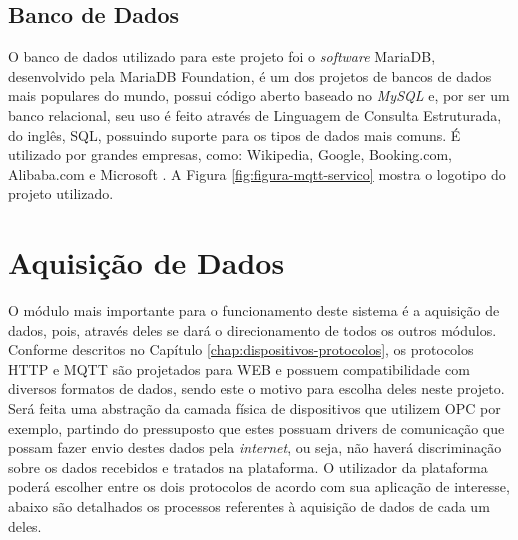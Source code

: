         \subsection{Banco de Dados}
        \label{sec:banco-dados}
        O banco de dados utilizado para este projeto foi o \textit{software} MariaDB, desenvolvido pela MariaDB Foundation, é um dos projetos de bancos de dados mais populares do mundo, possui código aberto baseado no \textit{MySQL} e, por ser um banco relacional, seu uso é feito através de Linguagem de Consulta Estruturada, do inglês, \gls{SQL}, possuindo suporte para os tipos de dados mais comuns. É utilizado por grandes empresas, como: Wikipedia, Google, Booking.com, Alibaba.com e Microsoft \cite{MariaDB}. A Figura \ref{fig:figura-mqtt-servico} mostra o logotipo do projeto utilizado.
        
        \begin{figure}[!h]
    	\end{figure}
    	
\section{Aquisição de Dados}
\label{sec:aquisicao-dados}
O módulo mais importante para o funcionamento deste sistema é a aquisição de dados, pois, através deles se dará o direcionamento de todos os outros módulos. Conforme descritos no Capítulo \ref{chap:dispositivos-protocolos}, os protocolos \gls{HTTP} e \gls{MQTT} são  projetados para \gls{WEB} e possuem compatibilidade com diversos formatos de dados, sendo este o motivo para escolha deles neste projeto. Será feita uma abstração da camada física de dispositivos que utilizem \gls{OPC} por exemplo, partindo do pressuposto que estes possuam drivers de comunicação que possam fazer envio destes dados pela \textit{internet}, ou seja, não haverá discriminação sobre os dados recebidos e tratados na plataforma. O utilizador da plataforma poderá escolher entre os dois protocolos de acordo com sua aplicação de interesse, abaixo são detalhados os processos referentes à aquisição de dados de cada um deles.

